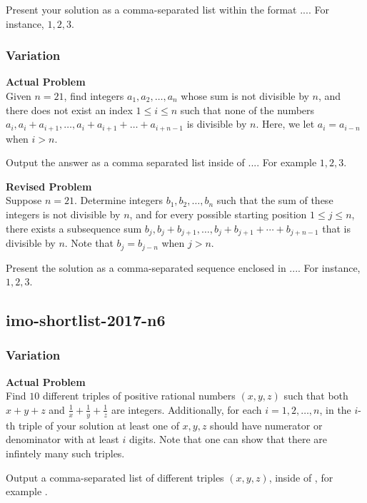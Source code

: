 Present your solution as a comma-separated list within the format $\boxed{...}$. For instance, $\boxed{1, 2, 3}$.

\subsubsection{Variation}
\textbf{Actual Problem}\\
Given $n = 21$, find integers $a_1,a_2,\ldots, a_n$ whose sum is not divisible by $n$, 
and there does not exist an index $1 \leq i \leq n$ such that none of the numbers $a_i,a_i+a_{i+1},\ldots,a_i+a_{i+1}+\ldots+a_{i+n-1}$ is divisible by $n$. 
Here, we let $a_i=a_{i-n}$ when $i >n$.


Output the answer as a comma separated list inside of $\boxed{...}$. For example $\boxed{1, 2, 3}$.

\textbf{Revised Problem}\\
Suppose \( n = 21 \). Determine integers \( b_1, b_2, \ldots, b_n \) such that the sum of these integers is not divisible by \( n \), and for every possible starting position \( 1 \leq j \leq n \), there exists a subsequence sum \( b_j, b_j+b_{j+1}, \ldots, b_j+b_{j+1}+\cdots+b_{j+n-1} \) that is divisible by \( n \). Note that \( b_j = b_{j-n} \) when \( j > n \).

Present the solution as a comma-separated sequence enclosed in $\boxed{...}$. For instance, $\boxed{1, 2, 3}$.

\subsection{imo-shortlist-2017-n6}
\subsubsection{Variation}
\textbf{Actual Problem}\\
Find $10$ different triples of positive rational numbers $(x, y, z)$ such that both $x + y + z$ and $\frac{1}{x} + \frac{1}{y} + \frac{1}{z}$ are integers.
Additionally, for each $i = 1, 2, \ldots, n$, in the $i$-th triple of your solution at least one of $x, y, z$ should have numerator or denominator with at least $i$ digits.
Note that one can show that there are infintely many such triples.


Output a comma-separated list of different triples $(x, y, z)$, inside of \boxed, for example .

